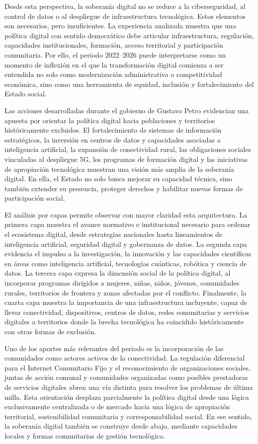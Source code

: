 \documentclass[9pt,letterpaper,twocolumn,twoside,apabib]{rho-class/rho}
\begin{document}
Desde esta perspectiva, la soberanía digital no se reduce a la ciberseguridad, al control de datos o al despliegue de infraestructura tecnológica. Estos elementos son necesarios, pero insuficientes. La experiencia analizada muestra que una política digital con sentido democrático debe articular infraestructura, regulación, capacidades institucionales, formación, acceso territorial y participación comunitaria. Por ello, el periodo 2022–2026 puede interpretarse como un momento de inflexión en el que la transformación digital comienza a ser entendida no solo como modernización administrativa o competitividad económica, sino como una herramienta de equidad, inclusión y fortalecimiento del Estado social.

Las acciones desarrolladas durante el gobierno de Gustavo Petro evidencian una apuesta por orientar la política digital hacia poblaciones y territorios históricamente excluidos. El fortalecimiento de sistemas de información estratégicos, la inversión en centros de datos y capacidades asociadas a inteligencia artificial, la expansión de conectividad rural, las obligaciones sociales vinculadas al despliegue 5G, los programas de formación digital y las iniciativas de apropiación tecnológica muestran una visión más amplia de la soberanía digital. En ella, el Estado no solo busca mejorar su capacidad técnica, sino también extender su presencia, proteger derechos y habilitar nuevas formas de participación social.

El análisis por capas permite observar con mayor claridad esta arquitectura. La primera capa muestra el avance normativo e institucional necesario para ordenar el ecosistema digital, desde estrategias nacionales hasta lineamientos de inteligencia artificial, seguridad digital y gobernanza de datos. La segunda capa evidencia el impulso a la investigación, la innovación y las capacidades científicas en áreas como inteligencia artificial, tecnologías cuánticas, robótica y ciencia de datos. La tercera capa expresa la dimensión social de la política digital, al incorporar programas dirigidos a mujeres, niñas, niños, jóvenes, comunidades rurales, territorios de frontera y zonas afectadas por el conflicto. Finalmente, la cuarta capa muestra la importancia de una infraestructura incluyente, capaz de llevar conectividad, dispositivos, centros de datos, redes comunitarias y servicios digitales a territorios donde la brecha tecnológica ha coincidido históricamente con otras formas de exclusión.

Uno de los aportes más relevantes del periodo es la incorporación de las comunidades como actores activos de la conectividad. La regulación diferencial para el Internet Comunitario Fijo y el reconocimiento de organizaciones sociales, juntas de acción comunal y comunidades organizadas como posibles prestadoras de servicios digitales abren una vía distinta para resolver los problemas de última milla. Esta orientación desplaza parcialmente la política digital desde una lógica exclusivamente centralizada o de mercado hacia una lógica de apropiación territorial, sostenibilidad comunitaria y corresponsabilidad social. En ese sentido, la soberanía digital también se construye desde abajo, mediante capacidades locales y formas comunitarias de gestión tecnológica.
\end{document}
